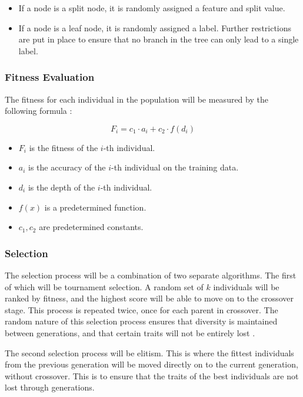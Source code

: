 \documentclass[12pt]{article}
\begin{document}
\begin{itemize}
    \item If a node is a split node, it is randomly assigned a feature and split value.
    \item If a node is a leaf node, it is randomly assigned a label. Further restrictions are put in place to ensure that no branch in the tree can only lead to a single label.
\end{itemize}

\subsubsection{Fitness Evaluation}

The fitness for each individual in the population will be measured by the following formula \cite{faik_2020}:

\[F_i = c_1 \cdot a_i + c_2 \cdot f(d_i)\]

\begin{itemize}
    \item $F_i$ is the fitness of the $i$-th individual.
    \item $a_i$ is the accuracy of the $i$-th individual on the training data.
    \item $d_i$ is the depth of the $i$-th individual.
    \item $f(x)$ is a predetermined function.
    \item $c_1, c_2$ are predetermined constants.
\end{itemize}

\subsubsection{Selection}

The selection process will be a combination of two separate algorithms. The first of which will be tournament selection. A random set of $k$ individuals will be ranked by fitness, and the highest score will be able to move on to the crossover stage. This process is repeated twice, once for each parent in crossover. The random nature of this selection process ensures that diversity is maintained between generations, and that certain traits will not be entirely lost \cite{blickle_1997}.

The second selection process will be elitism. This is where the fittest individuals from the previous generation will be moved directly on to the current generation, without crossover. This is to ensure that the traits of the best individuals are not lost through generations.
\end{document}
